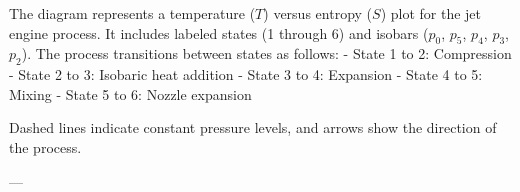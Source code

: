 The diagram represents a temperature (\(T\)) versus entropy (\(S\)) plot for the jet engine process. It includes labeled states (1 through 6) and isobars (\(p_0\), \(p_5\), \(p_4\), \(p_3\), \(p_2\)). The process transitions between states as follows:  
- State 1 to 2: Compression  
- State 2 to 3: Isobaric heat addition  
- State 3 to 4: Expansion  
- State 4 to 5: Mixing  
- State 5 to 6: Nozzle expansion  

Dashed lines indicate constant pressure levels, and arrows show the direction of the process.  

---
